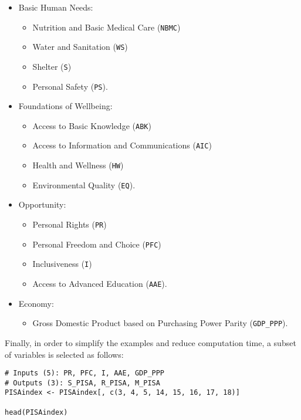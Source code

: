 \begin{itemize}
\tightlist
\item
  Basic Human Needs:

  \begin{itemize}
  \tightlist
  \item
    Nutrition and Basic Medical Care (\texttt{NBMC})
  \item
    Water and Sanitation (\texttt{WS})
  \item
    Shelter (\texttt{S})
  \item
    Personal Safety (\texttt{PS}).
  \end{itemize}
\item
  Foundations of Wellbeing:

  \begin{itemize}
  \tightlist
  \item
    Access to Basic Knowledge (\texttt{ABK})
  \item
    Access to Information and Communications (\texttt{AIC})
  \item
    Health and Wellness (\texttt{HW})
  \item
    Environmental Quality (\texttt{EQ}).
  \end{itemize}
\item
  Opportunity:

  \begin{itemize}
  \tightlist
  \item
    Personal Rights (\texttt{PR})
  \item
    Personal Freedom and Choice (\texttt{PFC})
  \item
    Inclusiveness (\texttt{I})
  \item
    Access to Advanced Education (\texttt{AAE}).
  \end{itemize}
\item
  Economy:

  \begin{itemize}
  \tightlist
  \item
    Gross Domestic Product based on Purchasing Power Parity (\texttt{GDP\_PPP}).
  \end{itemize}
\end{itemize}

Finally, in order to simplify the examples and reduce computation time, a subset of variables is selected as follows:

\begin{verbatim}
# Inputs (5): PR, PFC, I, AAE, GDP_PPP
# Outputs (3): S_PISA, R_PISA, M_PISA
PISAindex <- PISAindex[, c(3, 4, 5, 14, 15, 16, 17, 18)]

head(PISAindex)
\end{verbatim}

